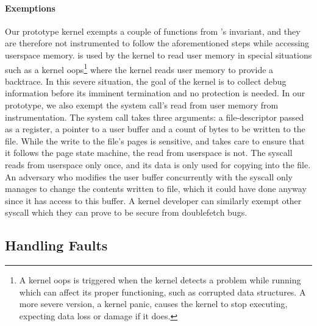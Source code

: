 \documentclass[letterpaper,twocolumn,10pt, anonymous]{article}
\begin{document}
\paragraph{Exemptions}
Our prototype \tiktok kernel exempts a couple of functions 
from \tiktok's invariant, and they are therefore not instrumented 
to follow the aforementioned steps while accessing userspace
memory. 
 is used by the kernel to 
read user memory in special situations such as a kernel 
oops\footnote{A kernel oops is triggered when the kernel detects a 
problem while running which can affect its proper functioning, such 
as corrupted data structures. 
A more severe version, a kernel panic, causes the kernel to stop 
executing, expecting data loss or damage if it does.}
where the kernel reads user memory to provide a backtrace. 
In this severe situation, the goal of the kernel is to collect debug 
information before its imminent termination and no \tocttou protection 
is needed.
In our prototype, we also exempt the  system 
call's read from user memory from instrumentation.
The  system call takes three arguments: a 
file-descriptor passed as a register, a pointer to a user 
buffer and a count of bytes to be written to the file.
While the write to the file's pages is sensitive, and 
\tiktok takes care to ensure that it follows the page state 
machine, the read from userspace is not. 
The syscall reads from userspace only once, and its data 
is only used for copying into the file.
An adversary who modifies the user buffer concurrently with 
the syscall only manages to change the contents written to 
file, which it could have done anyway since it has access to 
this buffer.
A kernel developer can similarly exempt other syscall which 
they can prove to be secure from doublefetch bugs.

\subsection{Handling Faults}
\end{document}
